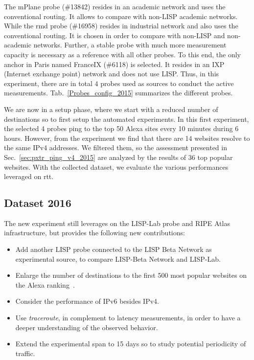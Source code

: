 The mPlane probe (\#13842) resides in an academic network and uses the conventional routing. It allows to compare with non-LISP academic networks. While the rmd probe (\#16958) resides in industrial network and also uses the conventional routing. It is chosen in order to compare with non-LISP and non-academic networks. Further, a stable probe with much more measurement capacity is necessary as a reference with all other probes. To this end, the only anchor in Paris named FranceIX (\#6118) is selected. It resides in an IXP (Internet exchange point) network and does not use LISP. Thus, in this experiment, there are in total 4 probes used as sources to conduct the active measurements. Tab.~\ref{Probes_config_2015} summarizes the different probes.

We are now in a setup phase, where we start with a reduced number of destinations so to first setup the automated experiments. In this first experiment, the selected 4 probes ping to the top 50 Alexa sites every 10 minutes during 6 hours. However, from the experiment we find that there are 14 websites resolve to the same IPv4 addresses. We filtered them, so the assessment presented in Sec.~\ref{sec:pxtr_ping_v4_2015} are analyzed by the results of 36 top popular websites. With the collected dataset, we evaluate the various performances leveraged on \acrshort{rtt}.

\subsection{Dataset 2016}
\label{sec:pxtr_meth_2016}
The new experiment still leverages on the LISP-Lab probe and RIPE Atlas infrastructure, but provides the following new contributions:
\begin{itemize}[noitemsep,topsep=0pt]
    \item Add another LISP probe connected to the LISP Beta Network as experimental source, to compare LISP-Beta Network and LISP-Lab.
    \item Enlarge the number of destinations to the first 500 most popular websites on the Alexa ranking~\cite{alexa}.
    \item Consider the performance of IPv6 besides IPv4.
    \item Use \emph{traceroute}, in complement to latency measurements, in order to have a deeper understanding of the observed behavior.
    \item Extend the experimental span to 15 days so to study potential periodicity of traffic.
\end{itemize}

